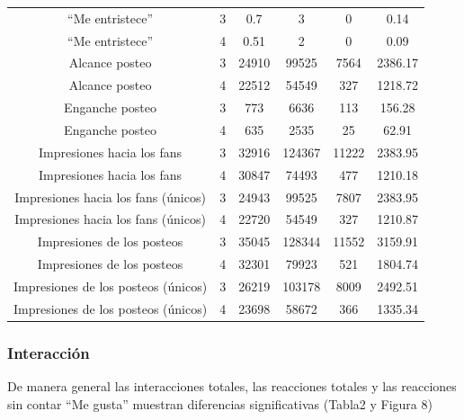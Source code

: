 \documentclass[a4paper,10pt]{article}
\begin{document}
\begin{center}
{\begin{tabular} {c|c|c|c|c|c}
   ``Me entristece'' & 3  & 0.7 & 3 & 0 & 0.14 \\
   ``Me entristece'' & 4  & 0.51 & 2 & 0 & 0.09 \\
   Alcance posteo  & 3  & 24910 & 99525 & 7564 & 2386.17 \\
   Alcance posteo & 4 & 22512 & 54549 & 327 & 1218.72 \\
   Enganche posteo & 3  & 773 & 6636 & 113 & 156.28 \\
   Enganche posteo & 4  & 635 & 2535 & 25 & 62.91 \\
   Impresiones hacia los fans & 3  & 32916 & 124367 & 11222 & 2383.95 \\
   Impresiones hacia los fans & 4  & 30847 & 74493 & 477 &  1210.18 \\   
   Impresiones hacia los fans (únicos) & 3  & 24943 & 99525 & 7807 & 2383.95 \\
   Impresiones hacia los fans (únicos) & 4  & 22720 & 54549 & 327 & 1210.87 \\
   Impresiones de los posteos & 3  & 35045 & 128344 & 11552 & 3159.91 \\
   Impresiones de los posteos & 4  & 32301 & 79923  & 521 &  1804.74 \\
   Impresiones de los posteos (únicos) &  3  & 26219 & 103178 & 8009 & 2492.51 \\
   Impresiones de los posteos (únicos) & 4  & 23698 & 58672 & 366 & 1335.34 \\
   \hline    
  \end{tabular}
 }
\end{center}


\subsubsection{Interacción}
De manera general las interacciones totales, las reacciones totales y
las reacciones sin contar ``Me gusta'' muestran diferencias significativas 
(Tabla2 y Figura 8)
\end{document}
